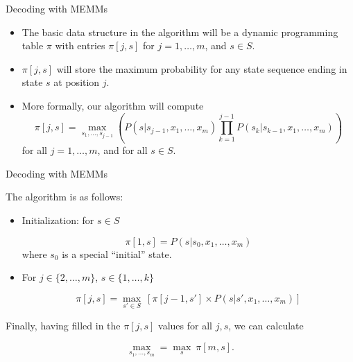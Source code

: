 \documentclass[handout]{beamer}
\begin{document}
\begin{frame}{Decoding with MEMMs}
\begin{scriptsize}
\begin{itemize}

\item The basic data structure in the algorithm will be a dynamic programming table $\pi$ with entries $\pi[j,s]$ for $j=1, \dots, m$, and $s \in S$.

\item  $\pi[j,s]$ will store the maximum probability for any state sequence ending in state $s$ at position $j$.

\item More formally, our algorithm will compute 
\begin{displaymath}
\pi[j,s] =  \max_{s_1,\dots, s_{j-1}}\left(P(s | s_{j-1}, x_1, \dots, x_m) \prod_{k=1}^{j-1}    P(s_k | s_{k-1}, x_1, \dots, x_m)\right)
\end{displaymath}
for all $j = 1, \dots,m$, and for all $s \in S$.

\end{itemize}


\end{scriptsize}
\end{frame}




\begin{frame}{Decoding with MEMMs}
\begin{scriptsize}
The algorithm is as follows:

\begin{itemize}

\item  Initialization: for $s \in  S$

\begin{displaymath}
  \pi[1,s] = P (s | s_0,x_1,\dots,x_m)
\end{displaymath}
where $s_0$ is a special ``initial'' state.

\item For $j \in \{2,\dots,m\}$, $s \in  \{1,\dots,k\}$

\begin{displaymath}
  \pi[j,s] =  \max_{s' \in S} \ [\pi[j-1,s'] \times P (s | s',x_1,\dots,x_m)]
\end{displaymath}

\end{itemize}

Finally, having filled in the $\pi[j,s]$ values for all $j, s$, we can calculate

\begin{displaymath}
  \max_{s_1,\dots,s_m} = \max_{s} \ \pi[m,s].
\end{displaymath}


\end{scriptsize}
\end{frame}
\end{document}
